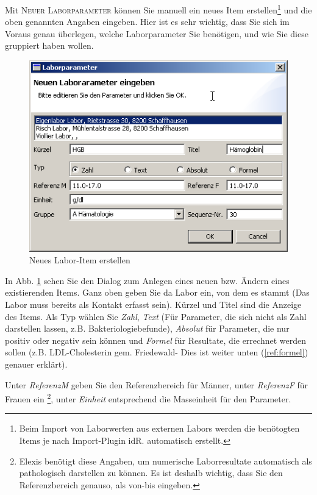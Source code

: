 Mit \textsc{Neuer Laborparameter} können Sie manuell ein neues Item erstellen\footnote{Beim Import von Laborwerten aus externen Labors werden die benötogten Items je nach Import-Plugin idR. automatisch erstellt.} und die oben genannten Angaben eingeben. Hier ist es sehr wichtig, dass Sie sich im Voraus genau überlegen, welche Laborparameter Sie benötigen, und wie Sie diese gruppiert haben wollen.
\begin{figure}[htp]
\begin{center}
  \includegraphics{images/labor1}
  \caption{Neues Labor-Item erstellen}
  \label{fig:labor1}
\end{center}
\end{figure}

In Abb. \ref{fig:labor1} sehen Sie den Dialog zum Anlegen eines neuen bzw. Ändern eines existierenden Items. Ganz oben geben Sie da Labor ein, von dem es stammt (Das Labor muss bereits als Kontakt erfasst sein). Kürzel und Titel sind die Anzeige des Items. Als Typ wählen Sie \textit{Zahl}, \textit{Text} (Für Parameter, die sich nicht als Zahl darstellen lassen, z.B. Bakteriologiebefunde), \textit{Absolut} für Parameter, die nur positiv oder negativ sein können und \textit{Formel} für Resultate, die errechnet werden sollen (z.B. LDL-Cholesterin gem. Friedewald- Dies ist weiter unten (\ref{ref:formel}) genauer erklärt).

Unter \textit{ReferenzM} geben Sie den Referenzbereich für Männer, unter \textit{ReferenzF} für Frauen ein \footnote{Elexis benötigt diese Angaben, um numerische Laborresultate automatisch als pathologisch darstellen zu können. Es ist deshalb wichtig, dass Sie den Referenzbereich genauso, als von-bis eingeben.}, unter \textit{Einheit} entsprechend die Masseinheit für den Parameter.

